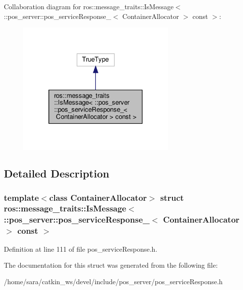 Collaboration diagram for ros\+:\+:message\+\_\+traits\+:\+:Is\+Message$<$ \+:\+:pos\+\_\+server\+:\+:pos\+\_\+service\+Response\+\_\+$<$ Container\+Allocator $>$ const $>$\+:
\nopagebreak
\begin{figure}[H]
\begin{center}
\leavevmode
\includegraphics[width=225pt]{structros_1_1message__traits_1_1IsMessage_3_01_1_1pos__server_1_1pos__serviceResponse___3_01Contd8069b959728ed2cc8d5393845d24aaf}
\end{center}
\end{figure}


\subsection{Detailed Description}
\subsubsection*{template$<$class Container\+Allocator$>$\newline
struct ros\+::message\+\_\+traits\+::\+Is\+Message$<$ \+::pos\+\_\+server\+::pos\+\_\+service\+Response\+\_\+$<$ Container\+Allocator $>$ const $>$}



Definition at line 111 of file pos\+\_\+service\+Response.\+h.



The documentation for this struct was generated from the following file\+:\begin{DoxyCompactItemize}
\item 
/home/sara/catkin\+\_\+ws/devel/include/pos\+\_\+server/pos\+\_\+service\+Response.\+h\end{DoxyCompactItemize}
